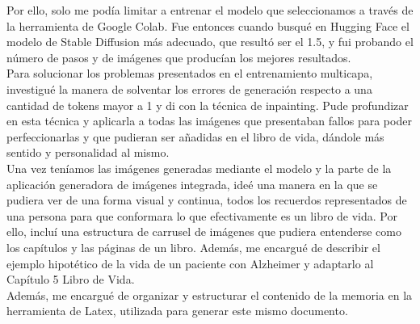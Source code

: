 Por ello, solo me podía limitar a entrenar el modelo que seleccionamos a través de la herramienta de Google Colab. Fue entonces cuando busqué en Hugging Face el modelo de Stable Diffusion más adecuado, que resultó ser el 1.5, y fui probando el número de pasos y de imágenes que producían los mejores resultados. \\

Para solucionar los problemas presentados en el entrenamiento multicapa, investigué la manera de solventar los errores de generación respecto a una cantidad de tokens mayor a 1 y di con la técnica de inpainting. Pude profundizar en esta técnica y aplicarla a todas las imágenes que presentaban fallos para poder perfeccionarlas y que pudieran ser añadidas en el libro de vida, dándole más sentido y personalidad al mismo. \\

Una vez teníamos las imágenes generadas mediante el modelo y la parte de la aplicación generadora de imágenes integrada, ideé una manera en la que se pudiera ver de una forma visual y continua, todos los recuerdos representados de una persona para que conformara lo que efectivamente es un libro de vida. Por ello, incluí una estructura de carrusel de imágenes que pudiera entenderse como los capítulos y las páginas de un libro. Además, me encargué de describir el ejemplo hipotético de la vida de un paciente con Alzheimer y adaptarlo al Capítulo 5 Libro de Vida.\\ 

Además, me encargué de organizar y estructurar el contenido de la memoria en la herramienta de Latex, utilizada para generar este mismo documento. \\



